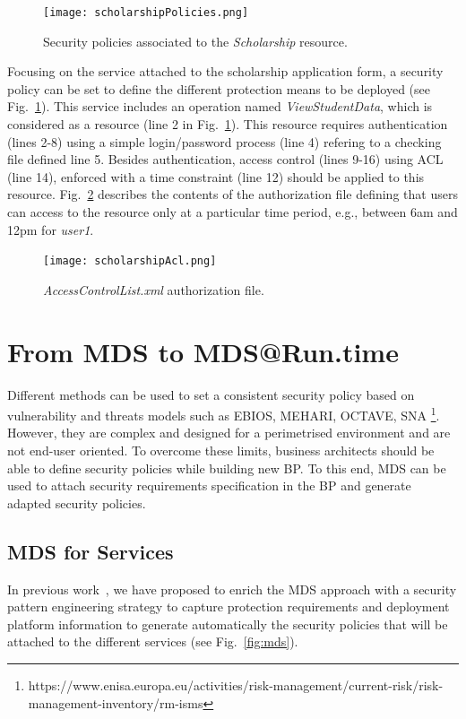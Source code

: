 \documentclass[runningheads,a4paper]{llncs}
\begin{document}
\begin{figure}  
\centering
\texttt{[image: scholarshipPolicies.png]}
\caption{Security policies associated to the \textit{Scholarship}  resource.}
\label{fig:policy}
\end{figure}

Focusing on the service attached to the scholarship application form, a security policy can be set to define the different protection means to be deployed (see Fig.~\ref{fig:policy}). This service includes an operation named \textit{ViewStudentData}, which is considered as a resource (line 2 in
Fig.~\ref{fig:policy}). This resource requires authentication (lines 2-8) using a simple login/password process (line 4) refering to a checking file defined line 5. Besides authentication, access control (lines 9-16) using ACL (line 14), enforced with a time constraint (line 12) should be applied to this resource. Fig.~\ref{fig:acl} describes the contents of the authorization file defining that users can access to the resource only at a particular time period, e.g., between 6am and 12pm for \textit{user1}.
 
\begin{figure}
\centering
\texttt{[image: scholarshipAcl.png]}
\caption{\textit{AccessControlList.xml} authorization file.}
\label{fig:acl}
\end{figure}



\section{From MDS to MDS@Run.time}
\label{MDStoMDSatRuntime}
Different methods can be used to set a consistent security policy based on vulnerability and threats models such as EBIOS, MEHARI, OCTAVE, SNA \footnote{https://www.enisa.europa.eu/activities/risk-management/current-risk/risk-management-inventory/rm-isms}. However, they are complex and designed for a perimetrised environment and are not end-user oriented. To overcome these limits, business architects should be able to define security policies while building new BP. To this end, MDS can be used to attach security requirements specification in the BP and generate adapted security policies.

\subsection{MDS for Services}
In previous work~\cite{OBG12}, we have proposed to enrich the MDS approach with a security pattern engineering strategy to capture protection requirements and deployment platform information to generate automatically the security policies that will be attached to the different services (see Fig.~\ref{fig:mds}).
\end{document}
